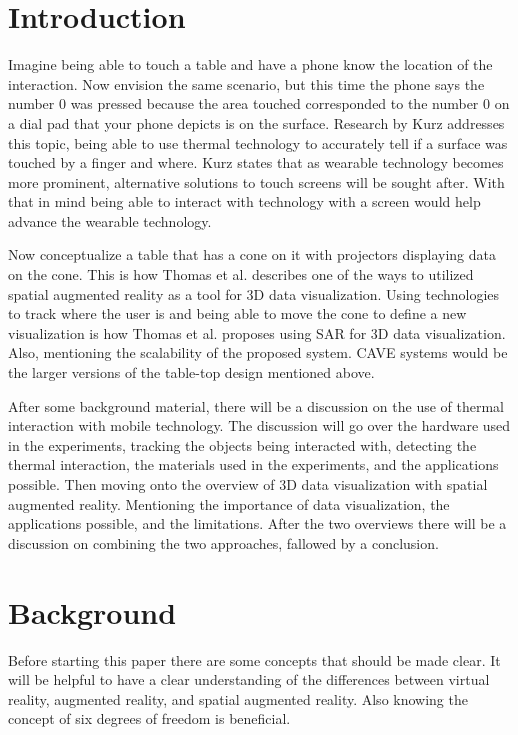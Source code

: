 \documentclass{sig-alternate}
\begin{document}
\section{Introduction}
\label{sec:Introduction}
Imagine being able to touch a table and have a phone know the location of the interaction. Now envision the same scenario, but this time the phone says the number 0 was pressed because the area touched corresponded to the number 0 on a dial pad that your phone depicts is on the surface. Research by Kurz \cite{Thermal} addresses this topic, being able to use thermal technology to accurately tell if a surface was touched by a finger and where. Kurz \cite{Thermal} states that as wearable technology becomes more prominent, alternative solutions to touch screens will be sought after. With that in mind being able to interact with technology with a screen would help advance the wearable technology.    

Now conceptualize a table that has a cone on it with projectors displaying data on the cone. This is how Thomas et al. describes one of the ways to utilized spatial augmented reality as a tool for 3D data visualization. Using technologies to track where the user is and being able to move the cone to define a new visualization is how Thomas et al. proposes using SAR for 3D data visualization. Also, mentioning the scalability of the proposed system. CAVE systems would be the larger versions of the table-top design mentioned above.      

After some background material, there will be a discussion on the use of thermal interaction with mobile technology. The discussion will go over the hardware used in the experiments, tracking the objects being interacted with, detecting the thermal interaction, the materials used in the experiments, and the applications possible. Then moving onto the overview of 3D data visualization with spatial augmented reality. Mentioning the importance of data visualization, the applications possible, and the limitations. After the two overviews there will be a discussion on combining the two approaches, fallowed by a conclusion.       


\section{Background}
\label{sec:background} 
Before starting this paper there are some concepts that should be made clear. It will be helpful to have a clear understanding of the differences between virtual reality, augmented reality, and spatial augmented reality. Also knowing the concept of six degrees of freedom is beneficial.  
\end{document}
